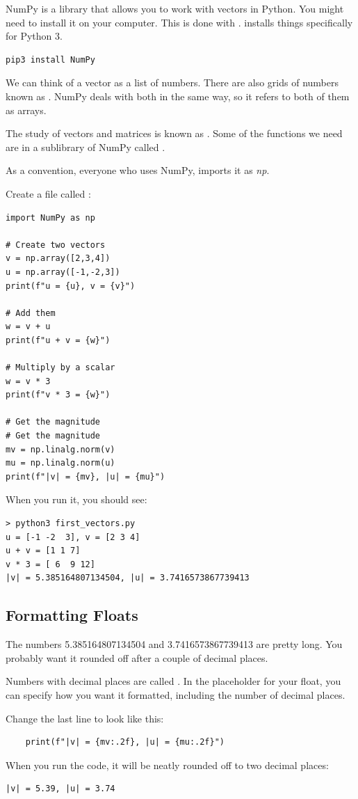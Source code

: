 NumPy is a library that allows you to work with vectors in Python.  
You might need to install it on your computer. This is done with . 
 installs things specifically for Python 3.

\begin{Verbatim}
pip3 install NumPy
\end{Verbatim}

We can think of a vector as a list of numbers.  
There are also grids of numbers known as . NumPy deals with both in the same way, 
so it refers to both of them as arrays.

The study of vectors and matrices is known as . Some of the functions we need
are in a sublibrary of NumPy called . 

As a convention, everyone who uses NumPy, imports it as \textit{np}. 

Create a file called :

\begin{Verbatim}
import NumPy as np

# Create two vectors
v = np.array([2,3,4])
u = np.array([-1,-2,3])
print(f"u = {u}, v = {v}")

# Add them
w = v + u
print(f"u + v = {w}")

# Multiply by a scalar
w = v * 3
print(f"v * 3 = {w}")

# Get the magnitude
# Get the magnitude
mv = np.linalg.norm(v)
mu = np.linalg.norm(u)
print(f"|v| = {mv}, |u| = {mu}")
\end{Verbatim}

When you run it, you should see:

\begin{Verbatim}
> python3 first_vectors.py
u = [-1 -2  3], v = [2 3 4]
u + v = [1 1 7]
v * 3 = [ 6  9 12]
|v| = 5.385164807134504, |u| = 3.7416573867739413
\end{Verbatim}

\subsection{Formatting Floats}

The numbers 5.385164807134504 and 3.7416573867739413 are pretty long.  You probably want it 
rounded off after a couple of decimal places.

Numbers with decimal places are called . In the placeholder for your float, you 
can specify how you want it formatted, including the number of decimal places.

Change the last line to look like this:
\begin{Verbatim}
    print(f"|v| = {mv:.2f}, |u| = {mu:.2f}")
\end{Verbatim}

When you run the code, it will be neatly rounded off to two decimal places:
\begin{Verbatim}
|v| = 5.39, |u| = 3.74
\end{Verbatim}
